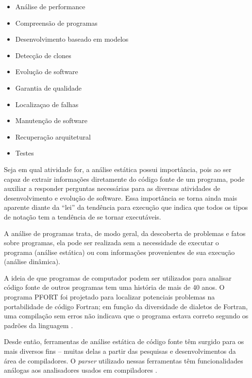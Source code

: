 \begin{multicols}{2}
  \begin{itemize}
    \item Análise de performance
    \item Compreensão de programas
    \item Desenvolvimento baseado em modelos
    \item Detecção de clones
    \item Evolução de software
    \item Garantia de qualidade
    \item Localizaçao de falhas
    \item Manutenção de software
    \item Recuperação arquitetural
    \item Testes
  \end{itemize}
\end{multicols}

Seja em qual atividade for, a análise estática possui importância,
pois ao ser capaz de extrair informações diretamente do
código fonte de um programa, pode auxiliar a responder perguntas necessárias
para as diversas atividades de desenvolvimento e evolução de software. Essa
importância se torna ainda mais aparente diante da ``lei'' da tendência para
execução \cite{Harman2010} que indica que todos os tipos de notação tem a
tendência de se tornar executáveis.


A análise de programas trata, de modo geral, da descoberta de problemas e
fatos sobre programas, ela pode ser realizada sem a necessidade de executar o
programa (análise estática) ou com informações provenientes de sua execução
(análise dinâmica).

A ideia de que programas de computador podem ser utilizados para analisar
código fonte de outros programas tem uma história de mais de 40 anos.  O
programa PFORT \cite{Ryder1974} foi projetado para localizar potenciais
problemas na portabilidade de código Fortran; em função da diversidade de
dialetos de Fortran, uma compilação sem erros não indicava que o programa
estava correto segundo os padrões da linguagem \cite{Wichmann1995}.

Desde então, ferramentas de análise estática de código fonte têm surgido para
os mais diversos fins -- muitas delas a partir das pesquisas e
desenvolvimentos da área de compiladores.  O {\it parser} utilizado nessas
ferramentas têm funcionalidades análogas aos analisadores usados em
compiladores \cite{Anderson2008}.


